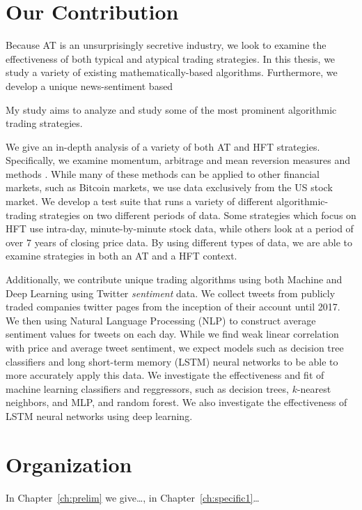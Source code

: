 \documentclass[../thesis.tex]{subfiles}
\begin{document}
\section{Our Contribution}
Because AT is an unsurprisingly secretive industry, we look to examine the effectiveness of both typical and atypical trading strategies. In this thesis, we study a variety of existing mathematically-based algorithms.  Furthermore, we develop a unique news-sentiment based 

My study aims to analyze and study some of the most prominent algorithmic trading strategies.

We give an in-depth analysis of a variety of both AT and HFT strategies. Specifically, we examine momentum, arbitrage and mean reversion measures and methods \cite{Aldridge2010}. While many of these methods can be applied to other financial markets, such as Bitcoin markets, we use data exclusively from the US stock market. We develop a test suite that runs a variety of different algorithmic-trading strategies on two different periods of data. Some strategies which focus on HFT use intra-day, minute-by-minute stock data, while others look at a period of over 7 years of closing price data. By using different types of data, we are able to examine strategies in both an AT and a HFT context. 

Additionally, we contribute unique trading algorithms using both Machine and Deep Learning using Twitter \textit{sentiment} data. We collect tweets from publicly traded companies twitter pages from the inception of their account until 2017. We then using Natural Language Processing (NLP) to construct average sentiment values for tweets on each day. While we find weak linear correlation with price and average tweet sentiment, we expect models such as decision tree classifiers and long short-term memory (LSTM) neural networks to be able to more accurately apply this data. We investigate the effectiveness and fit of machine learning classifiers and reggressors, such as decision trees, $k$-nearest neighbors, and MLP, and random forest. We also investigate the effectiveness of LSTM neural networks using deep learning. 

\section{Organization}
In Chapter~\ref{ch:prelim} we give\ldots, in Chapter~\ref{ch:specific1}\ldots

\end{document}
